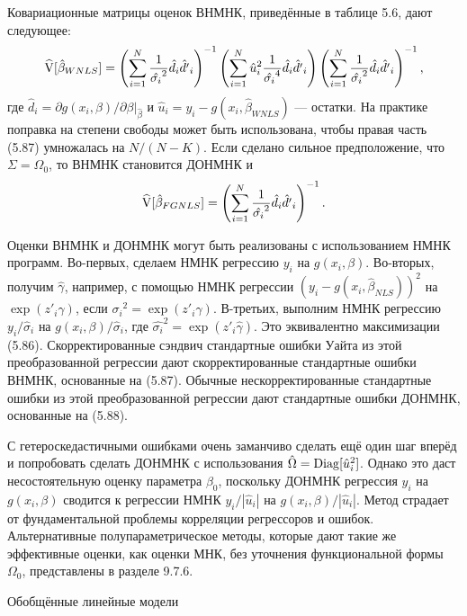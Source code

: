 Ковариационные матрицы оценок ВНМНК, приведённые в таблице 5.6, дают следующее:
\begin{equation}
\widehat{\mathrm{V}}[\hat{\beta}_{WNLS}]= \left( \sum_{i=1}^{N} \frac{1}{\hat{\sigma_i}^{2}} \hat{d}_i \hat{d'}_i \right) ^{-1} \left( \sum_{i=1}^{N} {\hat{u}_i}^2 \frac{1}{\hat{\sigma_i}^{4}} \hat{d}_i \hat{d'}_i \right) \left( \sum_{i=1}^{N} \frac{1}{\hat{\sigma_i}^{2}} \hat{d}_i \hat{d'}_i \right) ^{-1},
\end{equation}
где $\hat{d}_i=\partial g(x_i,\beta) / \partial \beta|_{\hat{\beta}}$ и $\hat{u}_i=y_i-g(x_i,\hat{\beta}_{WNLS})$ --- остатки. На практике поправка на степени свободы может быть использована, чтобы правая часть (5.87) умножалась на $N/(N-K)$. Если сделано сильное предположение, что $\Sigma=\Omega_0$, то ВНМНК становится ДОНМНК и 
\begin{equation}
\widehat{\mathrm{V}}[\hat{\beta}_{FGNLS}]=\left( \sum_{i=1}^{N} \frac{1}{\hat{\sigma_i}^{2}} \hat{d}_i \hat{d'}_i \right) ^{-1}.
\end{equation}

Оценки ВНМНК и ДОНМНК могут быть реализованы с использованием НМНК программ. Во-первых, сделаем НМНК регрессию $y_i$ на $g(x_i,\beta)$. Во-вторых, получим $\hat{\gamma}$, например, с помощью НМНК регрессии $(y_i-g(x_i,\hat{\beta}_{NLS}))^{2}$ на $\exp(z'_i\gamma)$, если ${\sigma_i}^{2}=\exp(z'_i\gamma)$. В-третьих, выполним НМНК регрессию $y_i/\hat{\sigma}_i$ на $g(x_i,\beta)/\hat{\sigma}_i$, где $\hat{\sigma_i}^{2}=\exp(z'_i\hat{\gamma})$. Это эквивалентно максимизации (5.86). Скорректированные сэндвич стандартные ошибки Уайта из этой преобразованной регрессии дают скорректированные стандартные ошибки ВНМНК, основанные на (5.87). Обычные нескорректированные стандартные ошибки из этой преобразованной регрессии дают стандартные ошибки ДОНМНК, основанные на (5.88).

С гетероскедастичными ошибками очень заманчиво сделать ещё один шаг вперёд и попробовать сделать ДОНМНК с использования $\hat{\Omega}=\mathrm{Diag}[{\hat{u}_i}^2]$. Однако это даст несостоятельную оценку параметра $\beta_0$, поскольку ДОНМНК регрессия $y_i$ на $g(x_i,\beta)$ сводится к регрессии НМНК $y_i/|\hat{u}_i|$ на $g(x_i,\beta)/|\hat{u}_i|$. Метод страдает от фундаментальной проблемы корреляции регрессоров и ошибок. Альтернативные полупараметрическое методы, которые дают такие же эффективные оценки, как оценки МНК, без уточнения функциональной формы $\Omega_0$, представлены в разделе 9.7.6.

\begin{center}
Обобщённые линейные модели
\end{center}

